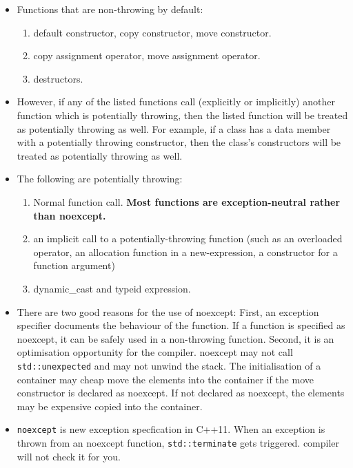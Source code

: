 \documentclass[a4paper,11pt,twoside]{book}
\begin{document}
\begin{itemize}
    \item Functions that are non-throwing by default:
        \begin{enumerate}
            \item default constructor, copy constructor, move constructor.
            \item copy assignment operator, move assignment operator.
            \item destructors.
        \end{enumerate}

    \item However, if any of the listed functions call (explicitly or implicitly) another function which is potentially throwing, then the listed function will be treated as potentially throwing as well. For example, if a class has a data member with a potentially throwing constructor, then the class’s constructors will be treated as potentially throwing as well. 
    \item The following are potentially throwing:
        \begin{enumerate}
            \item Normal function call. \textbf{Most functions are exception-neutral rather than noexcept.}
            \item an implicit call to a potentially-throwing function (such as an overloaded operator, an allocation function in a new-expression, a constructor for a function argument)
            \item dynamic\_cast and typeid expression.
        \end{enumerate}

    \item There are two good reasons for the use of noexcept: First, an exception specifier documents the behaviour of the function. If a function is specified as noexcept, it can be safely used in a non-throwing function. Second, it is an optimisation opportunity for the compiler. noexcept may not call \texttt{std::unexpected} and may not unwind the stack. The initialisation of a container may cheap move the elements into the container if the move constructor is declared as noexcept. If not declared as noexcept, the elements may be expensive copied into the container.

    \item \texttt{noexcept} is new exception specfication in C++11. When an exception is thrown from an noexcept function, \texttt{std::terminate} gets triggered. compiler will not check it for you.


\end{itemize}
\end{document}
